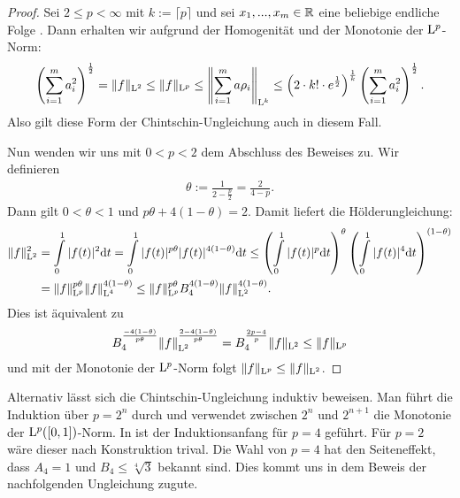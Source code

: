 \begin{proof}
	Sei $ 2 \leq p < \infty $ mit $ k := \lceil p \rceil $ und sei $ x_1,...,x_m \in \mathbb{R} $ eine beliebige endliche Folge .
	Dann erhalten wir aufgrund der Homogenität und der Monotonie der $ \mathrm{L}^p $-Norm:
	\begin{align*}
		\left(\sum \limits_{ i = 1}^m a_i^2\right)^\frac{1}{2}
		=
		\|f\|_{\mathrm{L}^2} \leq \|f\|_{\mathrm{L}^p} \leq 
		\left\|
		\sum \limits_{ i = 1}^m
		a \rho_i
		\right\|_{\mathrm{L}^k}
		\leq
		\left(2\cdot k! \cdot e^{\frac{1}{2}}\right)^\frac{1}{k}
		\left(\sum \limits_{ i = 1}^m a_i^2\right)^\frac{1}{2}.
	\end{align*}
	Also gilt diese Form der Chintschin-Ungleichung auch in diesem Fall.
	
	Nun wenden wir uns mit $ 0 < p < 2 $ dem Abschluss des Beweises zu.
	Wir definieren 
	\begin{align*}
		\theta := \frac{1}{2- \frac{p}{2}} = \frac{2}{4- p}.
	\end{align*}
	Dann gilt $ 0 < \theta <1 $ und $ p \theta + 4(1- \theta) = 2 $. Damit liefert die Hölderungleichung:
	\begin{align*}
		\|f\|_{\mathrm{L}^2}^2
		&=
		\int
		\limits_0^1
		|f(t)|^2
		\mathrm{d}t
		=
		\int
		\limits_0^1
		|f(t)|^{p\theta} 
		|f(t)|^{4(1-\theta)}
		\mathrm{d}t
		\leq
		\left(
		\int
		\limits_0^1
		|f(t)|^p
		\mathrm{d}t
		\right)^\theta
			\left(
		\int
		\limits_0^1
		|f(t)|^4
		\mathrm{d}t
		\right)^{(1-\theta)}\\
		&=
		\|f\|_{\mathrm{L}^p}^{p\theta}
		\|f\|_{\mathrm{L}^4}^{4(1-\theta)}
		\leq
		\|f\|_{\mathrm{L}^p}^{p\theta}	B_4^{4(1-\theta)} \|f\|_{\mathrm{L}^2}^{4(1-\theta)}.
	\end{align*}
	Dies ist äquivalent zu
	\begin{align*}
	B_4^{\frac{-4(1-\theta)}{p\theta}}	\|f\|_{\mathrm{L}^2}^{\frac{2 - 4(1- \theta) }{p\theta }}
	=
	B_4^{\frac{2p - 4}{p}} \|f\|_{\mathrm{L}^2}
	\leq \| f \|_{\mathrm{L}^p}
	\end{align*}
	und mit der Monotonie der $ \mathrm{L}^p $-Norm folgt $ \|f\|_{\mathrm{L}^p} \leq \|f \|_{\mathrm{L}^2} $.
\end{proof}
Alternativ lässt sich die Chintschin-Ungleichung induktiv beweisen.
Man führt die Induktion über $ p = 2^n $ durch und verwendet zwischen $ 2^n $ und $ 2^{n+1} $ die Monotonie der $ \mathrm{L}^p([0,1])$-Norm. 
In \cite{Diestel1995} ist der Induktionsanfang für $ p = 4 $ geführt. Für $ p = 2  $ wäre dieser nach Konstruktion trival.
Die Wahl von $ p = 4 $ hat den Seiteneffekt, dass $ A_4  = 1$ und  $B_4 \leq \sqrt[4]{3} $ bekannt sind. Dies kommt uns in dem Beweis der nachfolgenden Ungleichung zugute.



